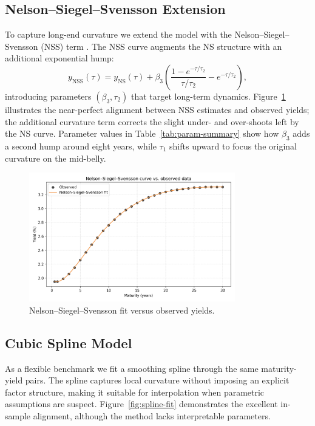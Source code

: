 \documentclass[12pt]{article}
\begin{document}
\subsection{Nelson--Siegel--Svensson Extension}
\begin{spacing}{1.15}
To capture long-end curvature we extend the model with the Nelson--Siegel--Svensson (NSS) term \parencite{diebold_li_2006, ecb_yield_curve_2018}. The NSS curve augments the NS structure with an additional exponential hump:
\begin{equation}
  y_{\text{NSS}}(\tau) = y_{\text{NS}}(\tau) + \beta_3 \left( \frac{1 - e^{-\tau/\tau_2}}{\tau/\tau_2} - e^{-\tau/\tau_2} \right),
\end{equation}
introducing parameters $(\beta_3, \tau_2)$ that target long-term dynamics. Figure~\ref{fig:nss-fit} illustrates the near-perfect alignment between NSS estimates and observed yields; the additional curvature term corrects the slight under- and over-shoots left by the NS curve. Parameter values in Table~\ref{tab:param-summary} show how $\beta_3$ adds a second hump around eight years, while $\tau_1$ shifts upward to focus the original curvature on the mid-belly.
\end{spacing}

\begin{figure}[htbp]
  \centering
  \includegraphics[width=0.8\textwidth]{../data/output/figure_nss_fit.png}
  \caption{Nelson--Siegel--Svensson fit versus observed yields.}
  \label{fig:nss-fit}
\end{figure}

\subsection{Cubic Spline Model}
\begin{spacing}{1.15}
As a flexible benchmark we fit a smoothing spline through the same maturity-yield pairs. The spline captures local curvature without imposing an explicit factor structure, making it suitable for interpolation when parametric assumptions are suspect. Figure~\ref{fig:spline-fit} demonstrates the excellent in-sample alignment, although the method lacks interpretable parameters.
\end{spacing}
\end{document}
